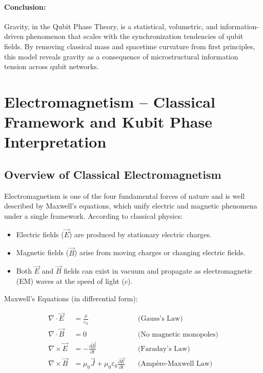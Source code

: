 \documentclass[12pt]{report} %
\begin{document}
\paragraph{Conclusion:}
Gravity, in the Qubit Phase Theory, is a statistical, volumetric, and information-driven phenomenon that scales with the synchronization tendencies of qubit fields. By removing classical mass and spacetime curvature from first principles, this model reveals gravity as a consequence of microstructural information tension across qubit networks.


\newpage
\section{Electromagnetism – Classical Framework and Kubit Phase Interpretation}

\subsection*{Overview of Classical Electromagnetism}

Electromagnetism is one of the four fundamental forces of nature and is well described by Maxwell’s equations, which unify electric and magnetic phenomena under a single framework. According to classical physics:

\begin{itemize}
  \item Electric fields ($\vec{E}$) are produced by stationary electric charges.
  \item Magnetic fields ($\vec{B}$) arise from moving charges or changing electric fields.
  \item Both $\vec{E}$ and $\vec{B}$ fields can exist in vacuum and propagate as electromagnetic (EM) waves at the speed of light ($c$).
\end{itemize}

Maxwell's Equations (in differential form):

\[
\begin{aligned}
\nabla \cdot \vec{E} &= \frac{\rho}{\varepsilon_0} &\quad\text{(Gauss's Law)} \\
\nabla \cdot \vec{B} &= 0 &\quad\text{(No magnetic monopoles)} \\
\nabla \times \vec{E} &= -\frac{\partial \vec{B}}{\partial t} &\quad\text{(Faraday's Law)} \\
\nabla \times \vec{B} &= \mu_0 \vec{J} + \mu_0 \varepsilon_0 \frac{\partial \vec{E}}{\partial t} &\quad\text{(Ampère-Maxwell Law)}
\end{aligned}
\]
\end{document}
